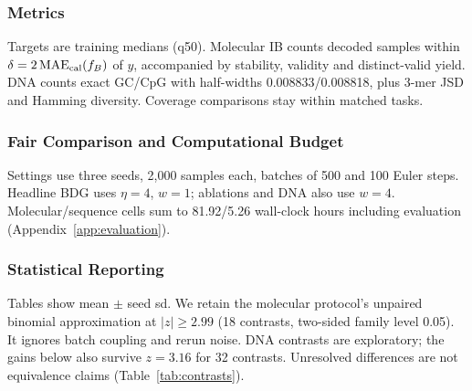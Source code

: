 \documentclass{article}
\begin{document}
\subsubsection{Metrics}
Targets are training medians (q50). Molecular IB counts decoded samples within $\delta=2\operatorname{MAE}_{\rm cal}(f_B)$ of $y$, accompanied by stability, validity and distinct-valid yield. DNA counts exact GC/CpG with half-widths 0.008833/0.008818, plus 3-mer JSD and Hamming diversity. Coverage comparisons stay within matched tasks.
\subsubsection{Fair Comparison and Computational Budget}
Settings use three seeds, 2,000 samples each, batches of 500 and 100 Euler steps. Headline BDG uses $\eta=4$, $w=1$; ablations and DNA also use $w=4$. Molecular/sequence cells sum to 81.92/5.26 wall-clock hours including evaluation (Appendix~\ref{app:evaluation}).
\subsubsection{Statistical Reporting}
Tables show mean $\pm$ seed sd. We retain the molecular protocol's unpaired binomial approximation at $|z|\ge2.99$ (18 contrasts, two-sided family level 0.05). It ignores batch coupling and rerun noise. DNA contrasts are exploratory; the gains below also survive $z=3.16$ for 32 contrasts. Unresolved differences are not equivalence claims (Table~\ref{tab:contrasts}).
\end{document}
